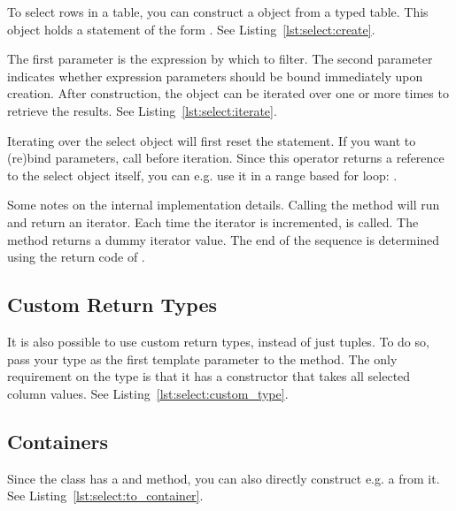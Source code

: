 To select rows in a table, you can construct a  object from a typed table. This object holds a statement of the form \newline {}. See Listing~\ref{lst:select:create}.



The first parameter is the expression by which to filter. The second parameter indicates whether expression parameters should be bound immediately upon creation. After construction, the object can be iterated over one or more times to retrieve the results. See Listing~\ref{lst:select:iterate}.



Iterating over the select object will first reset the statement. If you want to (re)bind parameters, call  before iteration. Since this operator returns a reference to the select object itself, you can e.g. use it in a range based for loop: .

Some notes on the internal implementation details. Calling the  method will run  and return an iterator. Each time the iterator is incremented,  is called. The  method returns a dummy iterator value. The end of the sequence is determined using the return code of .

\subsection{Custom Return Types}
\label{section:select:custom}

It is also possible to use custom return types, instead of just tuples. To do so, pass your type as the first template parameter to the  method. The only requirement on the type is that it has a constructor that takes all selected column values. See Listing~\ref{lst:select:custom_type}.



\subsection{Containers}
\label{section:select:container}

Since the  class has a  and  method, you can also directly construct e.g. a  from it. See Listing~\ref{lst:select:to_container}.


